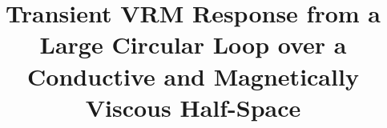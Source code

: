 \documentclass[onecolumn]{IEEEtran} %
\begin{document}
%
\title{Transient VRM Response from a Large Circular Loop over a Conductive and Magnetically Viscous Half-Space}






\maketitle

\end{document}
